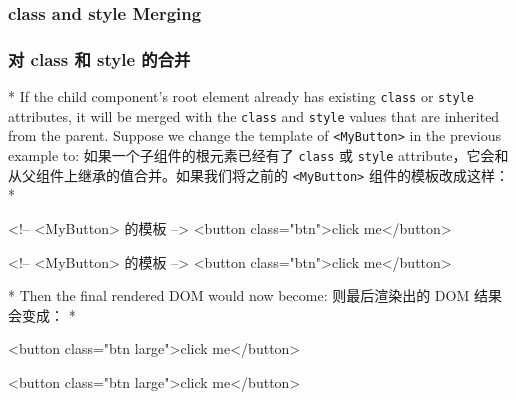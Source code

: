\begin{paracol}{2}
\subsubsection{class and style Merging}
\switchcolumn
\subsubsection{对 class 和 style 的合并}
\switchcolumn[0]*%
If the child component's root element already has existing
\texttt{class} or \texttt{style} attributes, it will be merged with the
\texttt{class} and \texttt{style} values that are inherited from the
parent. Suppose we change the template of
\texttt{\textless{}MyButton\textgreater{}} in the previous example to:
\switchcolumn
如果一个子组件的根元素已经有了 \texttt{class} 或 \texttt{style}
attribute，它会和从父组件上继承的值合并。如果我们将之前的
\texttt{\textless{}MyButton\textgreater{}} 组件的模板改成这样：
\switchcolumn[0]*%
\begin{codeHtml}
<!-- <MyButton> 的模板 -->
<button class="btn">click me</button>
\end{codeHtml}
\switchcolumn
\begin{codeHtml}
<!-- <MyButton> 的模板 -->
<button class="btn">click me</button>
\end{codeHtml}
\switchcolumn[0]*%
Then the final rendered DOM would now become:
\switchcolumn
则最后渲染出的 DOM 结果会变成：
\switchcolumn[0]*%
\begin{codeHtml}
<button class="btn large">click me</button>
\end{codeHtml}
\switchcolumn
\begin{codeHtml}
<button class="btn large">click me</button>
\end{codeHtml}
\end{paracol}

